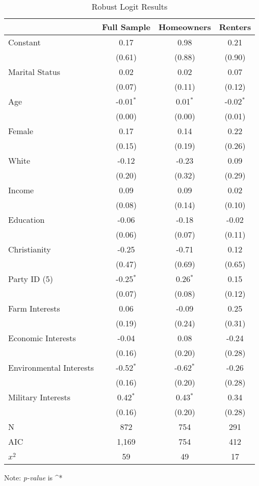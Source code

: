 \documentclass[document]{cup-journal}
\begin{document}
 

\begin{table}[H]
\centering
\caption{Robust Logit Results} 
\label{Table 3}
\begin{tabular}{l | c | c | c}
            & Full Sample & Homeowners & Renters \\
			\hline
			Constant & 0.17 & 0.98 & 0.21\\
			& (0.61) & (0.88) & (0.90)\\ 
			Marital Status & 0.02 & 0.02 & 0.07\\ 
			& (0.07) & (0.11) & (0.12) \\ 
			Age & -0.01$^{*}$ & 0.01$^{*}$ & -0.02$^{*}$\\
			& (0.00) & (0.00) & (0.01) \\ 
			Female & 0.17 & 0.14 & 0.22\\
			& (0.15) & (0.19) & (0.26)\\ 
			White & -0.12 & -0.23 & 0.09\\
			& (0.20) & (0.32) & (0.29) \\ 
			Income & 0.09 & 0.09 & 0.02\\ 
			& (0.08) & (0.14) & (0.10) \\ 
            Education & -0.06 & -0.18 & -0.02\\ 
			& (0.06) & (0.07) & (0.11) \\ 
            Christianity & -0.25 & -0.71 & 0.12 \\ 
			& (0.47)  & (0.69) &  (0.65)\\ 
            Party ID (5) & -0.25$^{*}$ & 0.26$^{*}$ & 0.15\\ 
			& (0.07) & (0.08) & (0.12)\\ 
            Farm Interests & 0.06 & -0.09 & 0.25 \\ 
			& (0.19) & (0.24) & (0.31)\\ 
            Economic Interests & -0.04 & 0.08 & -0.24\\ 
			& (0.16) & (0.20) & (0.28)\\ 
            Environmental Interests & -0.52$^{*}$ & -0.62$^{*}$ & -0.26\\ 
			& (0.16) & (0.20) & (0.28)\\ 
            Military Interests & 0.42$^{*}$ & 0.43$^{*}$ & 0.34\\ 
			& (0.16) & (0.20) & (0.28) \\
			\hline
			N & 872 & 754 & 291 \\
			AIC & 1,169 & 754 & 412\\
		  $x^2$ & 59 & 49 & 17\\ 
                \end{tabular}
                \begin{tablenotes}[hang]
                \item[] Note: \emph{p-value} is  ^{*} 
                \end{tablenotes}
\end{table}
\end{document}
